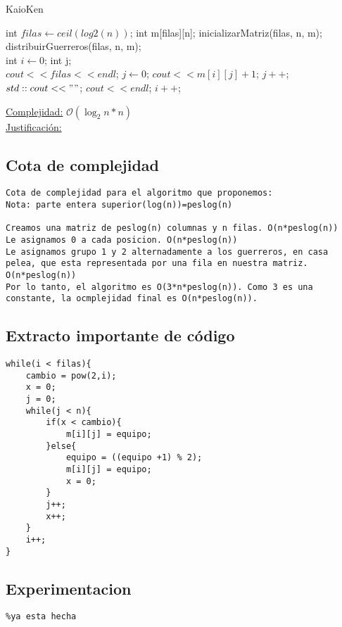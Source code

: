 \documentclass[10pt,a4paper]{article}
\begin{document}
\begin{algorithm}
\caption{KaioKen}
\begin{algorithmic}
	\State int $filas \gets ceil(log2(n))$;
	\State int m[filas][n];
	\State inicializarMatriz(filas, n, m);
	\State distribuirGuerreros(filas, n, m);
	\\
	\State int $i \gets 0$;
	\State int j;
	\\
	\State $cout << filas << endl$;
		\State $j \gets 0$;
			\State $cout << m[i][j]+1$;
			\State $j++$;
				\State $std::cout << " "$;
			\EndIf
		\EndWhile
		\State $cout << endl$;
		\State $i++$;
	\EndWhile
\EndFunction
\end{algorithmic}
\underline{Complejidad:} $\mathcal{O}(\log _{2} n * n)$\\
    \underline{Justificación:} 
\end{algorithm}



\subsection{Cota de complejidad}
\begin{verbatim}
Cota de complejidad para el algoritmo que proponemos:
Nota: parte entera superior(log(n))=peslog(n)

Creamos una matriz de peslog(n) columnas y n filas. O(n*peslog(n))
Le asignamos 0 a cada posicion. O(n*peslog(n))
Le asignamos grupo 1 y 2 alternadamente a los guerreros, en casa pelea, que esta representada por una fila en nuestra matriz. O(n*peslog(n))
Por lo tanto, el algoritmo es O(3*n*peslog(n)). Como 3 es una constante, la ocmplejidad final es O(n*peslog(n)).
\end{verbatim}

\subsection{Extracto importante de código}
\begin{lstlisting}
while(i < filas){
	cambio = pow(2,i);
	x = 0;
	j = 0;
	while(j < n){
		if(x < cambio){
			m[i][j] = equipo;
		}else{
			equipo = ((equipo +1) % 2);
			m[i][j] = equipo;
			x = 0;
		}
		j++;
		x++;
	}
	i++;
}
\end{lstlisting}

\subsection{Experimentacion}
\begin{verbatim}
%ya esta hecha
\end{verbatim}
\end{document}
